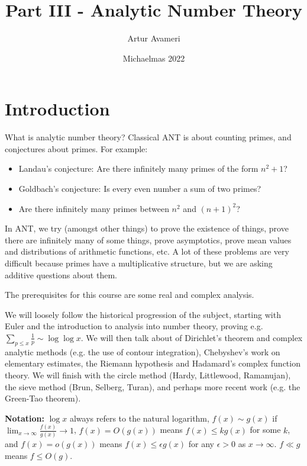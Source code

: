 \documentclass{article}
\title{Part III - Analytic Number Theory}
\author{Artur Avameri}
\date{Michaelmas 2022}
\theoremstyle{definition}
\begin{document}
\maketitle
\tableofcontents
\newpage

\section{Introduction}


What is analytic number theory? Classical ANT is about counting primes, and conjectures about primes. For example:
\begin{itemize}
    \item Landau's conjecture: Are there infinitely many primes of the form $n^2 +1$?
    \item Goldbach's conjecture: Is every even number a sum of two primes?
    \item Are there infinitely many primes between $n^2$ and $(n+1)^2$?
\end{itemize}

In ANT, we try (amongst other things) to prove the existence of things, prove there are infinitely many of some things, prove asymptotics, prove mean values and distributions of arithmetic functions, etc. A lot of these problems are very difficult because primes have a multiplicative structure, but we are asking additive questions about them.

The prerequisites for this course are some real and complex analysis. 

We will loosely follow the historical progression of the subject, starting with Euler and the introduction to analysis into number theory, proving e.g. $\sum_{p\le x}^{} \frac{1}{p} \sim \log \log x$. We will then talk about of Dirichlet's theorem and complex analytic methods (e.g. the use of contour integration), Chebyshev's work on elementary estimates, the Riemann hypothesis and Hadamard's complex function theory. We will finish with the circle method (Hardy, Littlewood, Ramanujan), the sieve method (Brun, Selberg, Turan), and perhaps more recent work (e.g. the Green-Tao theorem).

\vspace{1mm}

\textbf{Notation:}  $\log x$ always refers to the natural logarithm, $f(x) \sim g(x)$ if $\lim_{x \to \infty} \frac{f(x)}{g(x)} \to 1$, $f(x) = O(g(x))$ means $f(x) \le kg(x)$ for some $k$, and $f(x) = o(g(x))$ means $f(x) \le \epsilon g(x)$ for any $\epsilon>0$ as $x \to \infty$. $f \ll g$ means $f \le O(g)$.
\end{document}

